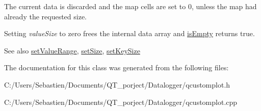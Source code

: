The current data is discarded and the map cells are set to 0, unless the map had already the requested size.

Setting {\itshape value\+Size} to zero frees the internal data array and \hyperlink{class_q_c_p_color_map_data_aea88cc75a76ca571acf29b2ba8ac970d}{is\+Empty} returns true.

\begin{DoxySeeAlso}{See also}
\hyperlink{class_q_c_p_color_map_data_ada1b2680ba96a5f4175b6d341cf75d23}{set\+Value\+Range}, \hyperlink{class_q_c_p_color_map_data_a0d9ff35c299d0478b682bfbcdd9c097e}{set\+Size}, \hyperlink{class_q_c_p_color_map_data_ac7ef70e383aface34b44dbde49234b6b}{set\+Key\+Size} 
\end{DoxySeeAlso}


The documentation for this class was generated from the following files\+:\begin{DoxyCompactItemize}
\item 
C\+:/\+Users/\+Sebastien/\+Documents/\+Q\+T\+\_\+porject/\+Datalogger/qcustomplot.\+h\item 
C\+:/\+Users/\+Sebastien/\+Documents/\+Q\+T\+\_\+porject/\+Datalogger/qcustomplot.\+cpp\end{DoxyCompactItemize}

